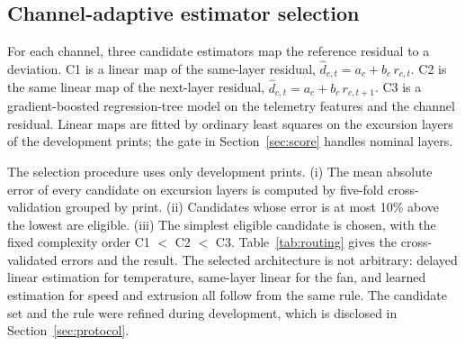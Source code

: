 \documentclass[10pt,a4paper,twocolumn]{article}
\begin{document}
\subsection{Channel-adaptive estimator selection}\label{sec:sel}
For each channel, three candidate estimators map the reference residual to a deviation. C1 is a linear map of the same-layer residual, $\widehat d_{c,t}=a_c+b_c\,r_{c,t}$. C2 is the same linear map of the next-layer residual, $\widehat d_{c,t}=a_c+b_c\,r_{c,t+1}$. C3 is a gradient-boosted regression-tree model \cite{Friedman2001,Pedregosa2011} on the \nRaw{} telemetry features and the channel residual. Linear maps are fitted by ordinary least squares on the excursion layers of the development prints; the gate in Section~\ref{sec:score} handles nominal layers.

The selection procedure uses only development prints. (i) The mean absolute error of every candidate on excursion layers is computed by five-fold cross-validation grouped by print. (ii) Candidates whose error is at most 10\% above the lowest are eligible. (iii) The simplest eligible candidate is chosen, with the fixed complexity order C1 $<$ C2 $<$ C3. Table~\ref{tab:routing} gives the cross-validated errors and the result. The selected architecture is not arbitrary: delayed linear estimation for temperature, same-layer linear for the fan, and learned estimation for speed and extrusion all follow from the same rule. The candidate set and the rule were refined during development, which is disclosed in Section~\ref{sec:protocol}.

\begin{table}[t]\centering\small
\caption{Development cross-validated MAE on excursion layers (51 development prints, grouped by print); bold marks the selected estimator.}\label{tab:routing}
\end{table}
\end{document}
